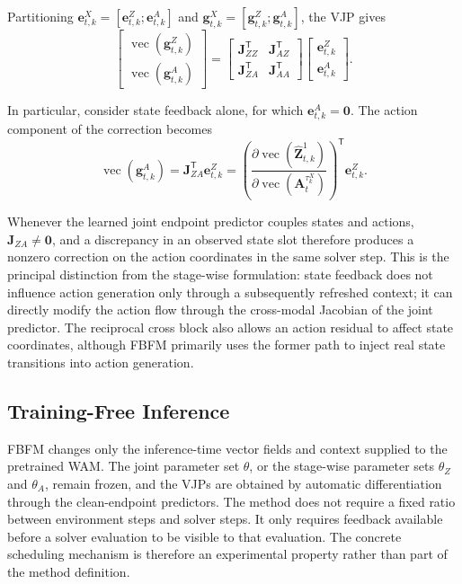 Partitioning
$\mathbf e_{t,k}^X=[\mathbf e_{t,k}^Z;\mathbf e_{t,k}^A]$ and
$\mathbf g_{t,k}^X=[\mathbf g_{t,k}^Z;\mathbf g_{t,k}^A]$, the VJP gives
\begin{equation}
    \begin{bmatrix}
        \operatorname{vec}(\mathbf g_{t,k}^Z)\\
        \operatorname{vec}(\mathbf g_{t,k}^A)
    \end{bmatrix}
    =
    \begin{bmatrix}
        \mathbf J_{ZZ}^{\mathsf T} & \mathbf J_{AZ}^{\mathsf T}\\
        \mathbf J_{ZA}^{\mathsf T} & \mathbf J_{AA}^{\mathsf T}
    \end{bmatrix}
    \begin{bmatrix}
        \mathbf e_{t,k}^Z\\
        \mathbf e_{t,k}^A
    \end{bmatrix}.
    \label{eq:joint-vjp-blocks}
\end{equation}

In particular, consider state feedback alone, for which
$\mathbf e_{t,k}^A=\mathbf 0$. The action component of the correction becomes
\begin{equation}
    \operatorname{vec}(\mathbf g_{t,k}^A)
    =
    \mathbf J_{ZA}^{\mathsf T}\mathbf e_{t,k}^Z
    =
    \left(
        \frac{\partial\operatorname{vec}(\hat{\mathbf Z}_{t,k}^1)}
             {\partial\operatorname{vec}(\mathbf A_t^{\tau_k^X})}
    \right)^{\mathsf T}
    \mathbf e_{t,k}^Z.
    \label{eq:direct-state-to-action-correction}
\end{equation}

Whenever the learned joint endpoint predictor couples states and actions,
$\mathbf J_{ZA}\neq\mathbf 0$, and a discrepancy in an observed state slot
therefore produces a nonzero correction on the action coordinates in the same
solver step. This is the principal distinction from the stage-wise formulation:
state feedback does not influence action generation only through a subsequently
refreshed context; it can directly modify the action flow through the cross-modal
Jacobian of the joint predictor. The reciprocal cross block also allows an action
residual to affect state coordinates, although FBFM primarily uses the former path
to inject real state transitions into action generation.


\subsection{Training-Free Inference}
\label{sec:method:training-free}

FBFM changes only the inference-time vector fields and context supplied to the
pretrained WAM. The joint parameter set $\theta$, or the stage-wise parameter sets
$\theta_Z$ and $\theta_A$, remain frozen, and the VJPs are obtained by automatic
differentiation through the clean-endpoint predictors.
The method does not require a fixed ratio between environment steps and solver
steps. It only requires feedback available before a solver evaluation to be visible
to that evaluation. The concrete scheduling mechanism is therefore an experimental
property rather than part of the method definition.
